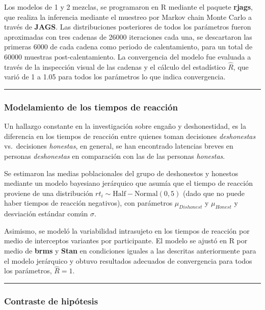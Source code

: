 \documentclass[]{article}
\begin{document}
Los modelos de 1 y 2 mezclas, se programaron en R mediante el paquete
\textbf{rjags}, que realiza la inferencia mediante el muestreo por
Markov chain Monte Carlo a través de \textbf{JAGS}. Las distribuciones
posteriores de todos los parámetros fueron aproximadas con tres cadenas
de 26000 iteraciones cada una, se descartaron las primeras 6000 de cada
cadena como periodo de calentamiento, para un total de 60000 muestras
post-calentamiento. La convergencia del modelo fue evaluada a través de
la inspección visual de las cadenas y el cálculo del estadístico
\(\hat{R}\), que varió de 1 a 1.05 para todos los parámetros lo que
indica convergencia.

\begin{center}\rule{0.5\linewidth}{\linethickness}\end{center}

\subsubsection{Modelamiento de los tiempos de
reacción}\label{modelamiento-de-los-tiempos-de-reaccion}

Un hallazgo constante en la investigación sobre engaño y deshonestidad,
es la diferencia en los tiempos de reacción entre quienes toman
decisiones \emph{deshonestas} vs.~decisiones \emph{honestas}, en
general, se han encontrado latencias breves en personas
\emph{deshonestas} en comparación con las de las personas
\emph{honestas}.

Se estimaron las medias poblacionales del grupo de deshonestos y
honestos mediante un modelo bayesiano jerárquico que asumía que el
tiempo de reacción proviene de una distribución
\(rt_i \sim \mathrm{Half-Normal}(0, 5)\) (dado que no puede haber
tiempos de reacción negativos), con parámetros \(\mu_{Dishonest}\) y
\(\mu_{Honest}\) y desviación estándar común \(\sigma\).

Asimismo, se modeló la variabilidad intrasujeto en los tiempos de
reacción por medio de interceptos variantes por participante. El modelo
se ajustó en R por medio de \textbf{brms} y \textbf{Stan} en condiciones
iguales a las descritas anteriormente para el modelo jerárquico y obtuvo
resultados adecuados de convergencia para todos los parámetros,
\(\hat{R} = 1\).

\begin{center}\rule{0.5\linewidth}{\linethickness}\end{center}

\subsubsection{Contraste de hipótesis}\label{contraste-de-hipotesis}
\end{document}
